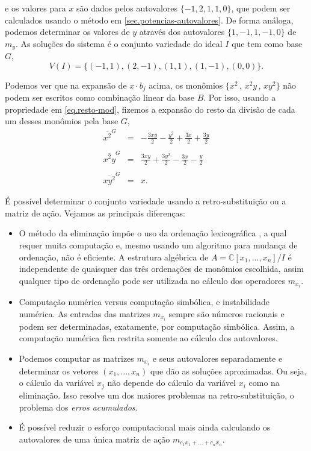 e os valores para $x$ são dados pelos autovalores $\{-1,2,1,1,0\}$, que podem ser calculados usando o método em \ref{sec.potencias-autovalores}.
 De forma análoga, podemos determinar os valores de $y$ através dos autovalores $\{1,-1,1,-1,0\}$ de $m_y$. As soluções do sistema é o conjunto variedade do ideal $I$ que tem como base $G$,
 \begin{equation*}
 V(I)=\{(-1,1),(2,-1),(1,1),(1,-1),(0,0)\}.
 \end{equation*}

Podemos ver que na expansão de $x\cdot b_j$ acima, os monômios $\{x^2\,,\,x^2y\,,\,xy^2\}$ não podem ser escritos como combinação linear da base $B$. Por isso, usando a propriedade em \ref{eq.resto-mod}, fizemos a expansão do resto da divisão de cada um desses monômios pela base $G$,
\begin{equation*}
\begin{array}{rcl}
\overline{x^2}^{G}&=&-\frac{3xy}{2}-\frac{y^2}{2}+\frac{3x}{2}+\frac{3y}{2}\\\\
\overline{x^2y}^{G}&=&\frac{3xy}{2}+\frac{3y^2}{2}-\frac{3x}{2}-\frac{y}{2}\\\\
\overline{xy^2}^{G}&=&x.
\end{array}
\end{equation*}

É possível determinar o conjunto variedade usando a retro-substituição ou a matriz de ação. Vejamos as principais diferenças:
\begin{itemize}
\item O método da eliminação impõe o uso da ordenação
lexicográfica , a qual requer muita computação e, mesmo usando um algoritmo para mudança de ordenação, não é eficiente. A estrutura algébrica de $A={\mathbb{C}}[x_1,...,x_n]/I$
é independente de quaisquer das três ordenações de monômios escolhida, assim qualquer tipo de ordenação pode ser utilizada no cálculo dos operadores $m_{x_i}$.
\item Computação numérica versus computação simbólica, e instabilidade numérica. As entradas das matrizes $m_{x_i}$ sempre são números racionais e podem ser determinadas, exatamente, por
computação simbólica. Assim, a computação numérica fica restrita somente ao cálculo dos
autovalores.
\item  Podemos computar as matrizes $m_{x_i}$ 
 e seus autovalores separadamente e determinar os
vetores $(x_1,...,x_n)$
 que dão as soluções aproximadas. Ou seja, o cálculo da variável $x_j$
não depende do cálculo da variável $x_i$
 como na eliminação. Isso resolve um dos maiores problemas na retro-substituição, o problema dos {\it erros acumulados}.

\item É possível reduzir o esforço computacional mais ainda calculando os autovalores de uma única matriz de ação $m_{c_1x_1+...+c_nx_n}$.

\end{itemize}









